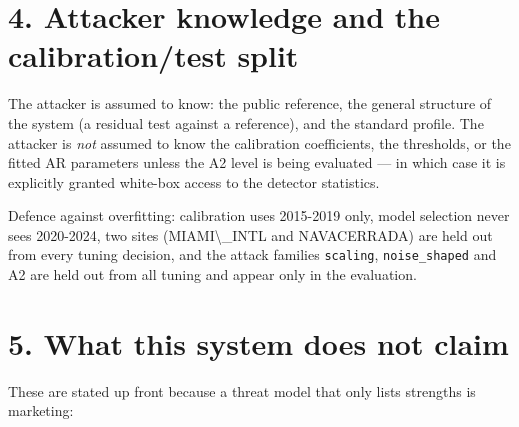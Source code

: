 \documentclass[10pt,a4paper]{article}
\begin{document}
\section*{4. Attacker knowledge and the calibration/\allowbreak{}test split}
The attacker is assumed to know: the public reference, the general structure of the system (a residual test against a reference), and the standard profile. The attacker is \emph{not} assumed to know the calibration coefficients, the thresholds, or the fitted AR parameters unless the A2 level is being evaluated — in which case it is explicitly granted white-\allowbreak{}box access to the detector statistics.

Defence against overfitting: calibration uses 2015-\allowbreak{}2019 only, model selection never sees 2020-\allowbreak{}2024, two sites (MIAMI\textbackslash{}\_\allowbreak{}INTL and NAVACERRADA) are held out from every tuning decision, and the attack families \texttt{scaling}, \texttt{noise\_\allowbreak{}shaped} and A2 are held out from all tuning and appear only in the evaluation.

\section*{5. What this system does \textbf{not} claim}
These are stated up front because a threat model that only lists strengths is marketing:
\end{document}
